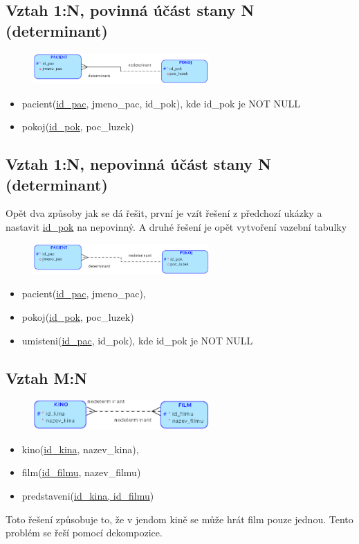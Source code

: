 \documentclass{szzclass}
\begin{document}
\subsection{Vztah 1:N, povinná účást stany N (determinant)}
\begin{figure}[h!]
    \centering
    \includegraphics[width=0.6\textwidth]{topics/bi-wsi-si-02/images/oneToN.png}
\end{figure}
\begin{itemize}
    \item pacient(\underline{id\_pac}, jmeno\_pac, id\_pok), kde id\_pok je NOT NULL
    \item pokoj(\underline{id\_pok}, poc\_luzek)
\end{itemize}


\subsection{Vztah 1:N, nepovinná účást stany N (determinant)}
Opět dva způsoby jak se dá řešit, první je vzít řešení z předchozí ukázky a nastavit \underline{id\_pok} na nepovinný. A druhé řešení
je opět vytvoření vazební tabulky
\begin{figure}[h!]
    \centering
    \includegraphics[width=0.6\textwidth]{topics/bi-wsi-si-02/images/oneToNV2.png}
\end{figure}
\begin{itemize}
    \item pacient(\underline{id\_pac}, jmeno\_pac),
    \item pokoj(\underline{id\_pok}, poc\_luzek)
    \item umisteni(\underline{id\_pac}, id\_pok), kde id\_pok je NOT NULL
\end{itemize}


\subsection{Vztah M:N}
\begin{figure}[h!]
    \centering
    \includegraphics[width=0.6\textwidth]{topics/bi-wsi-si-02/images/MToN.png}
\end{figure}
\begin{itemize}
    \item kino(\underline{id\_kina}, nazev\_kina),
    \item film(\underline{id\_filmu}, nazev\_filmu)
    \item predstaveni(\underline{id\_kina, id\_filmu})
\end{itemize}
Toto řešení způsobuje to, že v jendom kině se může hrát film pouze jednou. Tento problém se řeší pomocí dekompozice.
\end{document}
